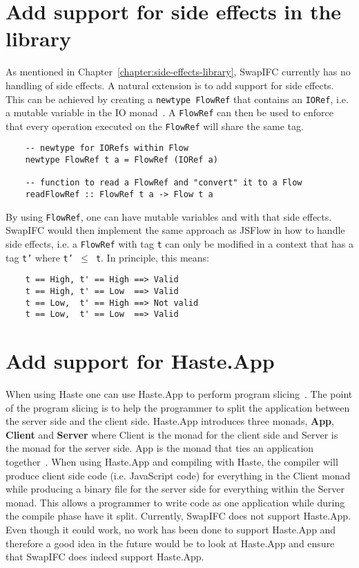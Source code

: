\section{Add support for side effects in the library}
As mentioned in Chapter~\ref{chapter:side-effects-library}, SwapIFC currently has no handling of side effects. A natural extension is to add support for side effects. This can be achieved by creating a {\tt newtype FlowRef} that contains an {\tt IORef}, i.e. a mutable variable in the IO monad~\cite{ioref}. A {\tt FlowRef} can then be used to enforce that every operation executed on the {\tt FlowRef} will share the same tag.
\begin{verbatim}
    -- newtype for IORefs within Flow
    newtype FlowRef t a = FlowRef (IORef a)

    -- function to read a FlowRef and "convert" it to a Flow
    readFlowRef :: FlowRef t a -> Flow t a
\end{verbatim}
By using {\tt FlowRef}, one can have mutable variables and with that side effects. SwapIFC would then implement the same approach as JSFlow in how to handle side effects, i.e. a {\tt FlowRef} with tag {\tt t} can only be modified in a context that has a tag {\tt t'} where {\tt t' \(\leq\) t}. In principle, this means:
\begin{verbatim}
    t == High, t' == High ==> Valid
    t == High, t' == Low  ==> Valid
    t == Low,  t' == High ==> Not valid
    t == Low,  t' == Low  ==> Valid
\end{verbatim}

\section{Add support for Haste.App}
\label{chapter:future-haste-app}
When using Haste one can use Haste.App to perform program slicing~\cite{haste-symposium}. The point of the program slicing is to help the programmer to split the application between the server side and the client side. Haste.App introduces three monads, \textbf{App}, \textbf{Client} and \textbf{Server} where Client is the monad for the client side and Server is the monad for the server side. App is the monad that ties an application together~\cite{haste-app}. When using Haste.App and compiling with Haste, the compiler will produce client side code (i.e. JavaScript code) for everything in the Client monad while producing a binary file for the server side for everything within the Server monad. This allows a programmer to write code as one application while during the compile phase have it split. Currently, SwapIFC does not support Haste.App. Even though it could work, no work has been done to support Haste.App and therefore a good idea in the future would be to look at Haste.App and ensure that SwapIFC does indeed support Haste.App.

